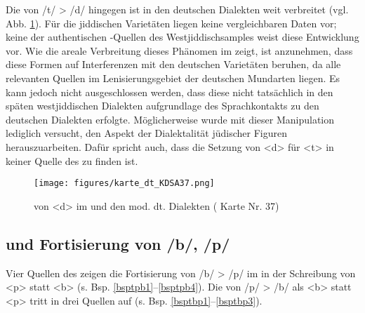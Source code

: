  Die  von /t/ > /d/ hingegen ist in den deutschen Dialekten weit verbreitet (vgl. Abb. \ref{kartedtkdsa}). Für die jiddischen Varietäten liegen keine vergleichbaren Daten vor; keine der authentischen -Quellen des Westjiddischsamples weist  diese Entwicklung vor. Wie die areale Verbreitung dieses Phänomen im  zeigt, ist anzunehmen, dass diese Formen auf Interferenzen mit den deutschen Varietäten beruhen, da alle relevanten Quellen im Lenisierungsgebiet der deutschen Mundarten liegen. Es kann jedoch nicht ausgeschlossen werden, dass diese  nicht tatsächlich in den späten westjiddischen Dialekten aufgrundlage des Sprachkontakts zu den deutschen Dialekten erfolgte. Möglicherweise wurde mit dieser Manipulation lediglich versucht, den Aspekt der Dialektalität jüdischer Figuren herauszuarbeiten. Dafür spricht auch, dass die Setzung von <d> für <t> in keiner Quelle des  zu finden ist.\\ %
 
 
  \begin{figure}[h!]
		\centering
\texttt{[image: figures/karte\_dt\_KDSA37.png]}
		\caption{\label{kartedtkdsa}  von <d> im  und den mod. dt. Dialekten ( Karte Nr. 37)}
		\end{figure}
\FloatBarrier




  
  \subsection{ und Fortisierung von /b/, /p/}\label{pb}

Vier Quellen des  zeigen die Fortisierung von /b/ > /p/ im  in der Schreibung von <p> statt <b> (s. Bsp. \ref{bsptpb1}–\ref{bsptpb4}). Die  von /p/ > /b/ als <b> statt <p> tritt in drei Quellen auf (s. Bsp. \ref{bsptbp1}–\ref{bsptbp3}).\\
 
   

